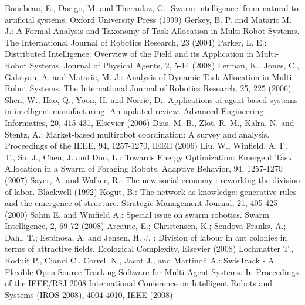 \documentclass{llncs}
\begin{document}
\begin{thebibliography}{}
Bonabeau, E., Dorigo, M. and Theraulaz, G.:
Swarm intelligence: from natural to artificial systems.
Oxford University Press (1999)
Gerkey, B. P. and Mataric M. J.:
A Formal Analysis and Taxonomy of Task Allocation in Multi-Robot Systems.
The International Journal of Robotics Research, 23 (2004)
Parker, L. E.:
Distributed Intelligence: Overview of the Field and its Application in Multi-Robot Systems.
Journal of Physical Agents, 2, 5-14 (2008)
Lerman, K., Jones, C., Galstyan, A. and Mataric, M. J.:
Analysis of Dynamic Task Allocation in Multi-Robot Systems. 
The International Journal of Robotics Research, 25, 225 (2006)
Shen, W., Hao, Q., Yoon, H. and Norrie, D.:
Applications of agent-based systems in intelligent manufacturing: An updated review. Advanced Engineering Informatics, 20, 415-431, Elsevier (2006)
Dias, M. B., Zlot, R. M., Kalra, N. and Stentz, A.:
Market-based multirobot coordination: A survey and analysis. 
Proceedings of the IEEE, 94, 1257-1270, IEEE (2006)
Liu, W., Winfield, A. F. T., Sa, J., Chen, J. and Dou, L.:
Towards Energy Optimization: Emergent Task Allocation in a Swarm of Foraging Robots. Adaptive Behavior, 94, 1257-1270 (2007)
Sayer, A. and Walker, R.: 
The new social economy : reworking the division of labor.
Blackwell (1992)
Kogut, B.: 
The network as knowledge: generative rules and the emergence of structure. 
Strategic Management Journal, 21, 405-425 (2000)
Sahin E. and Winfield A.: 
Special issue on swarm robotics.
Swarm Intelligence, 2, 69-72 (2008)
Arcaute, E.; Christensen, K.; Sendova-Franks, A.; Dahl, T.; Espinosa, A. and Jensen, H. J. : 
Division of labour in ant colonies in terms of attractive fields. 
Ecological Complexity, Elsevier (2008)
Lochmatter T., Roduit P., Cianci C., Correll N., Jacot J., and Martinoli A.: 
SwisTrack - A Flexible Open Source Tracking Software for Multi-Agent Systems. 
In Proceedings of the IEEE/RSJ 2008 International Conference on Intelligent Robots and Systems (IROS 2008), 4004-4010, IEEE (2008)
\end{thebibliography}
%
\end{document}
